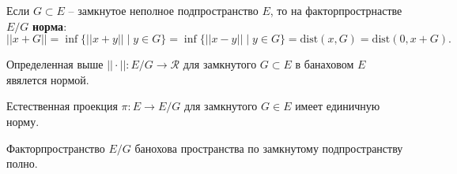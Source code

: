 \begin{to_def}
	Если $G \subset E$ -- замкнутое неполное подпространство $E$, то на факторпрострнастве $E/G$ \textbf{норма}:
	\begin{equation*}
		||x+G|| = \inf \{||x+y|| \mid y \in G\} = \inf \{||x-y|| \mid y \in G\} = \text{dist}(x,G) = \text{dist}(0,x+G).
	\end{equation*}
\end{to_def}
\begin{to_lem}
	Определенная выше $||\cdot|| \colon E/G \to \mathcal{R}$ для замкнутого $G \subset E$ в банаховом $E$ явялется нормой.
\end{to_lem}

\begin{to_lem}
	Естественная проекция $\pi \colon E \to E/G$ для замкнутого $G \in E$ имеет единичную норму.
\end{to_lem}

\begin{to_lem}
	Факторпространство $E/G$ банохова пространства по замкнутому подпространству полно.
\end{to_lem}